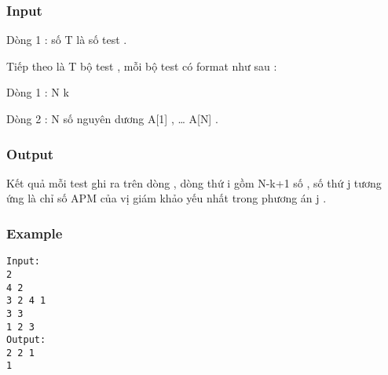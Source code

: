 \subsubsection{   Input  }

   Dòng 1 : số T là số test .   


   Tiếp theo là T bộ test , mỗi bộ test có format như sau :   


   Dòng 1 : N k   


   Dòng 2 : N số nguyên dương A[1] , … A[N] .   




\subsubsection{   Output  }

   Kết quả mỗi test ghi ra trên dòng , dòng thứ i gồm N-k+1 số , số thứ j tương ứng là chỉ số APM của vị giám khảo yếu nhất trong phương án j .  

\subsubsection{   Example  }
\begin{verbatim}
Input:
2
4 2
3 2 4 1
3 3
1 2 3
Output:
2 2 1
1
\end{verbatim}
